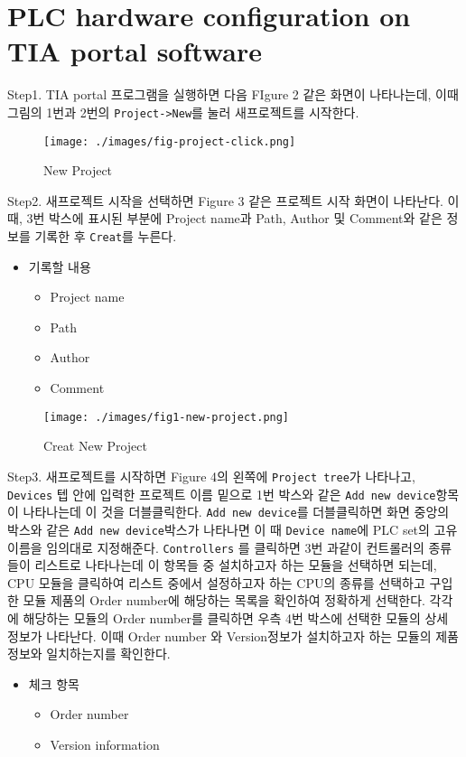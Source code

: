 \documentclass[11pt
  , a4paper
  , article
  , oneside
]{memoir}
\begin{document}
\section{PLC hardware configuration on TIA portal software}
Step1. TIA portal 프로그램을 실행하면 다음 FIgure 2 같은 화면이 나타나는데, 이때 그림의 1번과 2번의 \verb|Project->New|를 눌러 새프로젝트를 시작한다.\\
\begin{figure}[!htb]
  \centering
  \texttt{[image: ./images/fig-project-click.png]}
  \caption{New Project}
  \label{}
\end{figure}
\newline Step2. 새프로젝트 시작을 선택하면 Figure 3 같은 프로젝트 시작 화면이 나타난다. 이때, 3번 박스에 표시된 부분에 Project name과 Path, Author 및 Comment와 같은 정보를 기록한 후 \verb|Creat|를 누른다.\\
\begin{itemize}
\item 기록할 내용
\begin{itemize}
\item Project name 
\item Path
\item Author
\item Comment
\end{itemize}
\end{itemize}

\begin{figure}[!htb]
  \centering
  \texttt{[image: ./images/fig1-new-project.png]}
  \caption{Creat New Project}
  \label{}
\end{figure}

Step3. 새프로젝트를 시작하면 Figure 4의 왼쪽에 \verb|Project tree|가 나타나고, \verb|Devices| 텝 안에 입력한 프로젝트 이름 밑으로 1번 박스와 같은 \verb|Add new device|항목이 나타나는데 이 것을 더블클릭한다. \verb|Add new device|를 더블클릭하면 화면 중앙의 박스와 같은 \verb|Add new device|박스가 나타나면 이 때 \verb|Device name|에 PLC set의 고유 이름을 임의대로 지정해준다. \verb|Controllers| 를 클릭하면 3번 과같이 컨트롤러의 종류들이 리스트로 나타나는데 이 항목들 중 설치하고자 하는 모듈을 선택하면 되는데, CPU 모듈을 클릭하여 리스트 중에서 설정하고자 하는 CPU의 종류를 선택하고 구입한 모듈 제품의 Order number에 해당하는 목록을 확인하여 정확하게 선택한다. 각각에 해당하는 모듈의 Order number를 클릭하면 우측 4번 박스에 선택한 모듈의 상세 정보가 나타난다. 이때 Order number 와 Version정보가 설치하고자 하는 모듈의 제품 정보와 일치하는지를 확인한다.\\
\begin{itemize}
\item 체크 항목
\begin{itemize}
\item Order number
\item Version information
\end{itemize}
\end{itemize}
\end{document}
